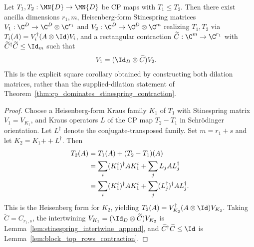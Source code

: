 \begin{corollary}\label{cor:cp_dominates_stinespring_contraction_canonical}
    \leanok
    Let $T_1,T_2:\MN{D}\to\MN{D}$ be CP maps with $T_1\le T_2$.
    Then there exist ancilla dimensions $r_1,m$, Heisenberg-form Stinespring
    matrices $V_1:\C^D\to\C^D\otimes\C^{r_1}$ and
    $V_2:\C^D\to\C^D\otimes\C^m$ realizing $T_1,T_2$ via
    $T_i(A)=V_i^\dagger(A\otimes\Id)V_i$, and a rectangular contraction
    $\widetilde C:\C^m\to\C^{r_1}$ with
    $\widetilde C^\dagger\widetilde C\le\Id_m$ such that
    \begin{align}
        V_1
        &=(\Id_D\otimes\widetilde C)V_2.
        \label{eq:representations_ordered_intertwining_canonical}
    \end{align}
    This is the explicit square corollary obtained by constructing both
    dilation matrices, rather than the supplied-dilation statement of
    Theorem~\ref{thm:cp_dominates_stinespring_contraction}.
\end{corollary}

\begin{proof}\leanok
    Choose a Heisenberg-form Kraus family $K_1$ of $T_1$ with Stinespring
    matrix $V_1=V_{K_1}$, and Kraus operators $L$ of the CP map
    $T_2-T_1$ in Schr\"odinger orientation. Let $L^\dagger$ denote the
    conjugate-transposed family. Set $m=r_1+s$ and let
    $K_2=K_1\mathbin{+\!+}L^\dagger$. Then
    \begin{align}
        T_2(A)
        &=T_1(A)+(T_2-T_1)(A) \notag\\
        &=\sum_i(K_1^i)^\dagger A K_1^i+\sum_jL_j A L_j^\dagger \notag\\
        &=\sum_i(K_1^i)^\dagger A K_1^i
          +\sum_j(L_j^\dagger)^\dagger A L_j^\dagger.
        \notag
    \end{align}
    This is the Heisenberg form for $K_2$, yielding
    $T_2(A)=V_{K_2}^\dagger(A\otimes\Id)V_{K_2}$. Taking
    $\widetilde C=C_{r_1,s}$, the intertwining
    $V_{K_1}=(\Id_D\otimes\widetilde C)V_{K_2}$ is
    Lemma~\ref{lem:stinespring_intertwine_append}, and
    $\widetilde C^\dagger\widetilde C\le\Id$ is
    Lemma~\ref{lem:block_top_rows_contraction}.
\end{proof}

